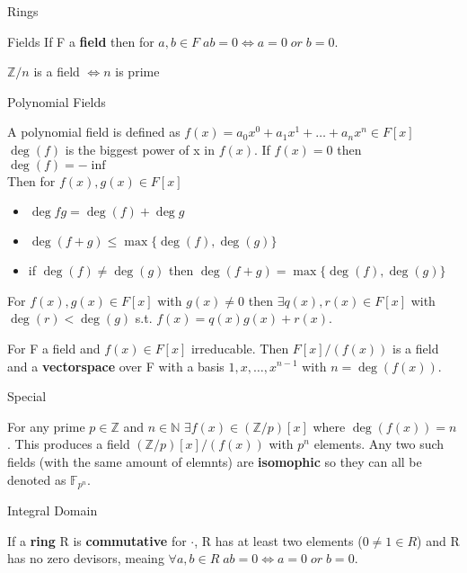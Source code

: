\documentclass[12pt, letterpaper]{article}
\begin{document}
\begin{section}{Rings}
\begin{subsection}{Fields}
    If F a \textbf{field} then for \(a, b \in F \; ab = 0 \iff a = 0 \; or \; b = 0\).

    \(\mathbb{Z}/n\) is a field \(\iff n\) is prime

    \begin{subsubsection}{Polynomial Fields}

      A polynomial field is defined as
      \(f(x) = a_{0}x^{0} + a_{1}x^{1} + \dots + a_{n}x^{n} \in F[x]\) \\
      \(\deg(f)\) is the biggest power of x in \(f(x)\). If \(f(x) = 0\) then
      \(\deg(f) = -\inf\) \\
      Then for \(f(x), g(x) \in F[x]\)
      \begin{itemize}
        \item \(\deg{fg} = \deg(f) + \deg{g}\)
        \item \(\deg(f + g) \leq \max\{ \deg(f), \deg(g) \}\)
        \item if \(\deg(f) \neq \deg(g)\) then \(\deg(f + g) = \max\{ \deg(f), \deg(g) \}\)
      \end{itemize}

      For \(f(x), g(x) \in F[x]\) with \(g(x) \neq 0\) then \(\exists q(x), r(x) \in F[x]\)
      with \(\deg(r) < \deg(g)\) s.t. \(f(x) = q(x)g(x) + r(x)\).

      For F a field and \(f(x) \in F[x]\) irreducable. Then \(F[x]/(f(x))\) is a field
      and a \textbf{vectorspace} over F with a basis \(1, x, \dots , x^{n - 1}\)
      with \(n = \deg(f(x))\).

    \end{subsubsection}

    \begin{subsubsection}{Special}

      For any prime \(p \in \mathbb{Z}\) and \(n \in \mathbb{N}\)
      \(\exists f(x) \in (\mathbb{Z} / p)[x]\) where \(\deg(f(x)) = n\).
      This produces a field \((\mathbb{Z} / p)[x] / (f(x))\) with \(p^{n}\)
      elements. Any two such fields (with the same amount of elemnts) are \textbf{isomophic}
      so they can all be denoted as \(\mathbb{F}_{p^{n}}\).

    \end{subsubsection}

  \end{subsection}

  \begin{subsection}{Integral Domain}

    If a  \textbf{ring} R is \textbf{commutative} for \(\cdot\), R has at least
    two elements (\(0 \neq 1 \in R\)) and R has no zero devisors, meaing
    \(\forall a, b \in R \; ab = 0 \iff a = 0 \; or \; b = 0\).


\end{subsection}
\end{section}
\end{document}
